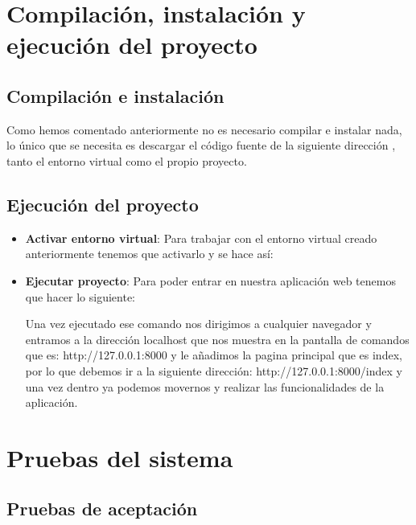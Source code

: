 \section{Compilación, instalación y ejecución del proyecto}

\subsection{Compilación e instalación}

Como hemos comentado anteriormente no es necesario compilar e instalar nada, lo único que se necesita es descargar el código fuente de la siguiente dirección \cite{Repositorio}, tanto el entorno virtual como el propio proyecto.

\subsection{Ejecución del proyecto}

\begin{itemize}
	\item \textbf{Activar entorno virtual}: Para trabajar con el entorno virtual creado anteriormente tenemos que activarlo y se hace así:
	
	\item \textbf{Ejecutar proyecto}: Para poder entrar en nuestra aplicación web tenemos que hacer lo siguiente:
	
	Una vez ejecutado ese comando nos dirigimos a cualquier navegador y entramos a la dirección localhost que nos muestra en la pantalla de comandos que es: http://127.0.0.1:8000 y le añadimos la pagina principal que es index, por lo que debemos ir a la siguiente dirección: http://127.0.0.1:8000/index y una vez dentro ya podemos movernos y realizar las funcionalidades de la aplicación.
\end{itemize}

\section{Pruebas del sistema} \label{pruebas}

\subsection{Pruebas de aceptación}

